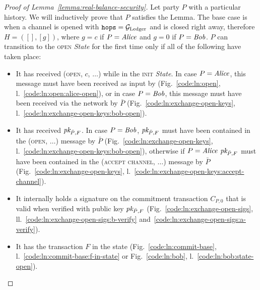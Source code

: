 \begin{proof}[Proof of Lemma~\ref{lemma:real-balance-security}]
  Let party $P$ with a particular history. We will inductively prove that $P$
  satisfies the Lemma. The base case is when a channel is opened with
  $\texttt{hops} = \mathcal{G}_{\mathrm{Ledger}}$ and is closed right away, therefore $H = ([], [g])$,
  where $g = c$ if $P = \mathit{Alice}$ and $g = 0$ if $P = \mathit{Bob}$.  $P$ can transition
  to the \textsc{open} \textit{State} for the first time only if all of the
  following have taken place:
  \begin{itemize}
    \item It has received (\textsc{open}, $c$, $\dots$) while in the
    \textsc{init} \textit{State}. In case $P = \mathit{Alice}$, this message must have
    been received as input by \environment (Fig.~\ref{code:ln:open},
    l.~\ref{code:ln:open:alice-open}), or in case $P = \mathit{Bob}$, this message must
    have been received via the network by $\bar{P}$
    (Fig.~\ref{code:ln:exchange-open-keys},
    l.~\ref{code:ln:exchange-open-keys:bob-open}).
    \item It has received $\textit{pk}_{\bar{P}, F}$. In case $P = \mathit{Bob}$, $\textit{pk}_{\bar{P},
    F}$ must have been contained in the (\textsc{open}, $\dots$) message by
    $\bar{P}$ (Fig.~\ref{code:ln:exchange-open-keys},
    l.~\ref{code:ln:exchange-open-keys:bob-open}), otherwise if $P = \mathit{Alice}$
    $\textit{pk}_{\bar{P}, F}$ must have been contained in the (\textsc{accept channel},
    $\dots$) message by $\bar{P}$ (Fig.~\ref{code:ln:exchange-open-keys},
    l.~\ref{code:ln:exchange-open-keys:accept-channel}).
    \item It internally holds a signature on the commitment transaction $C_{P,
    0}$ that is valid when verified with public key $\textit{pk}_{\bar{P}, F}$
    (Fig.~\ref{code:ln:exchange-open-sigs},
    ll.~\ref{code:ln:exchange-open-sigs:b-verify}
    and~\ref{code:ln:exchange-open-sigs:a-verify}).
    \item It has the transaction $F$ in the \ledger state
    (Fig.~\ref{code:ln:commit-base}, l.~\ref{code:ln:commit-base:f-in-state} or
    Fig.~\ref{code:ln:bob}, l.~\ref{code:ln:bob:state-open}).
  \end{itemize}


\end{proof}
